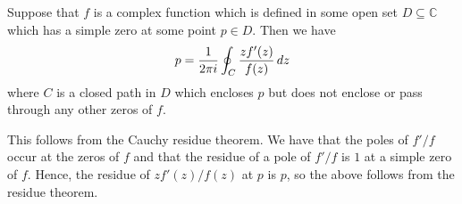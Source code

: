 \documentclass[12pt]{article}
\begin{document}
Suppose that $f$ is a complex function which is defined in some open
set $D \subseteq \mathbb{C}$ which has a simple zero at some point
$p \in D$.  Then we have
\[
p = {1 \over 2 \pi i} \oint_C {z f'(z) \over f(z)} \, dz
\]
where $C$ is a closed path in $D$ which encloses $p$ but does not enclose or
pass through any other zeros of $f$.

This follows from the Cauchy residue theorem.  We have that the poles of
$f'/f$ occur at the zeros of $f$ and that the residue of a pole of
$f'/f$ is $1$ at a simple zero of $f$.  Hence, the residue of
$z f'(z) / f(z)$ at $p$ is $p$, so the above  follows from the residue theorem. 
\end{document}
